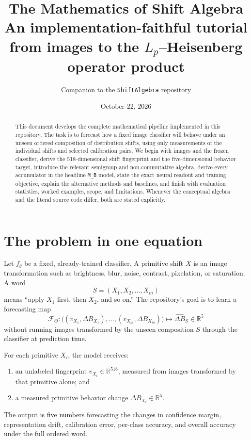 \documentclass[11pt,a4paper]{article}
\title{\textbf{The Mathematics of Shift Algebra}\\
\large An implementation-faithful tutorial from images to the $L_p$--Heisenberg operator product}
\author{Companion to the \texttt{ShiftAlgebra} repository}
\date{October 22, 2026}
\newcommand{\R}{\mathbb{R}}
\newcommand{\dB}{\Delta B}
\newcommand{\dBh}{\widehat{\Delta B}}
\newcommand{\MB}{\texttt{M\_B}}
\begin{document}
\maketitle

\begin{abstract}
This document develops the complete mathematical pipeline implemented in this
repository.  The task is to forecast how a fixed image classifier will behave
under an unseen ordered composition of distribution shifts, using only
measurements of the individual shifts and selected calibration pairs.  We begin
with images and the frozen classifier, derive the 518-dimensional shift
fingerprint and the five-dimensional behavior target, introduce the relevant
semigroup and non-commutative algebra, derive every accumulator in the headline
\MB{} model, state the exact neural readout and training objective, explain the
alternative methods and baselines, and finish with evaluation statistics,
worked examples, scope, and limitations.  Whenever the conceptual algebra and
the literal source code differ, both are stated explicitly.
\end{abstract}

\tableofcontents
\newpage

\section{The problem in one equation}

Let $f_\theta$ be a fixed, already-trained classifier.  A primitive shift $X$
is an image transformation such as brightness, blur, noise, contrast,
pixelation, or saturation.  A word
\[
S=(X_1,X_2,\ldots,X_m)
\]
means ``apply $X_1$ first, then $X_2$, and so on.''  The repository's goal is to
learn a forecasting map
\begin{equation}
\boxed{
\mathcal{F}_\Theta:\big((v_{X_1},\dB_{X_1}),\ldots,
(v_{X_m},\dB_{X_m})\big)
\longmapsto \dBh_S\in\R^5
}
\label{eq:problem}
\end{equation}
without running images transformed by the unseen composition $S$ through the
classifier at prediction time.

For each primitive $X_i$, the model receives:
\begin{enumerate}[label=(\roman*)]
  \item an unlabeled fingerprint $v_{X_i}\in\R^{518}$, measured from images
  transformed by that primitive alone; and
  \item a measured primitive behavior change $\dB_{X_i}\in\R^5$.
\end{enumerate}
The output is five numbers forecasting the changes in confidence margin,
representation drift, calibration error, per-class accuracy, and overall
accuracy under the full ordered word.
\end{document}
